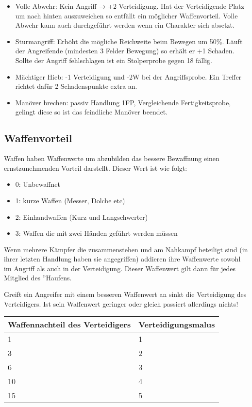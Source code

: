 \documentclass{article}
\begin{document}
\begin{itemize}
\item Volle Abwehr: Kein Angriff → +2 Verteidigung. Hat der Verteidigende Platz um nach hinten auszuweichen so entfällt ein möglicher Waffenvorteil. Volle Abwehr kann auch durchgeführt werden wenn ein Charakter sich absetzt.
\item Sturmangriff: Erhöht die mögliche Reichweite beim Bewegen um 50\%. Läuft der Angreifende (mindesten 3 Felder Bewegung) so erhält er +1 Schaden. Sollte der Angriff fehlschlagen ist ein Stolperprobe gegen 18 fällig.
\item Mächtiger Hieb: -1 Verteidigung und -2W bei der Angriffsprobe. Ein Treffer richtet dafür 2 Schadenspunkte extra an.
\item Manöver brechen: passiv Handlung 1FP, Vergleichende Fertigkeitsprobe, gelingt diese so ist das feindliche Manöver beendet.
\end{itemize}

\begin{center}
\subsection{Waffenvorteil}
\end{center}

Waffen haben Waffenwerte um abzubilden das bessere Bewaffnung einen ernstzunehmenden Vorteil darstellt. Dieser Wert
ist wie folgt:

\begin{itemize}
\item 0: Unbewaffnet
\item 1: kurze Waffen (Messer, Dolche etc)
\item 2: Einhandwaffen (Kurz und Langschwerter)
\item 3: Waffen die mit zwei Händen geführt werden müssen
\end{itemize}

Wenn mehrere Kämpfer die zusammenstehen und am Nahkampf beteiligt sind (in ihrer letzten Handlung haben sie
angegriffen) addieren ihre Waffenwerte sowohl im Angriff als auch in der Verteidigung. Dieser Waffenwert gilt dann
für jedes Mitglied des ''Haufens.

Greift ein Angreifer mit einem besseren Waffenwert an sinkt die Verteidigung des Verteidigers. Ist sein Waffenwert
geringer oder gleich passiert allerdings nichts!


\begin{small}
\begin{tabular}{|m{3cm}|m{3cm}|}
\hline
\textbf{Waffennachteil des Verteidigers}&\textbf{Verteidigungsmalus}\\
\hline
\hline
1&1\\
\hline
3&2\\
\hline
6&3\\
\hline
10&4\\
\hline
15&5\\
\hline
\end{tabular}
\end{small}
\end{document}
